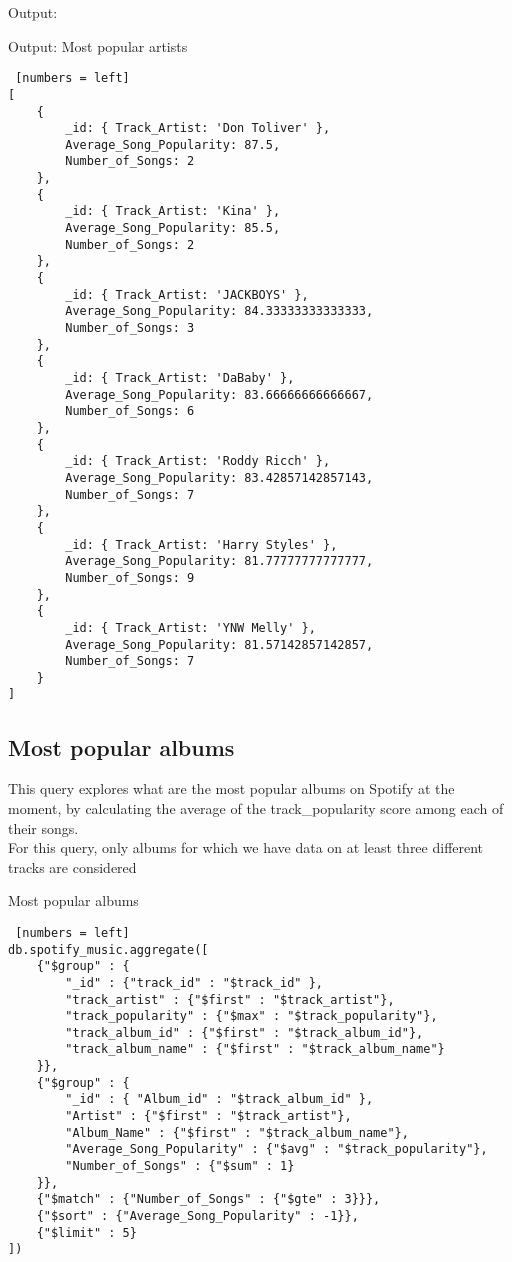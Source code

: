 Output:
\begin{algorithm}[h!]
\caption{Output: Most popular artists}
\begin{lstlisting} [numbers = left]
[
	{
		_id: { Track_Artist: 'Don Toliver' },
		Average_Song_Popularity: 87.5,
		Number_of_Songs: 2
	},
	{
		_id: { Track_Artist: 'Kina' },
		Average_Song_Popularity: 85.5,
		Number_of_Songs: 2
	},
	{
		_id: { Track_Artist: 'JACKBOYS' },
		Average_Song_Popularity: 84.33333333333333,
		Number_of_Songs: 3
	},
	{
		_id: { Track_Artist: 'DaBaby' },
		Average_Song_Popularity: 83.66666666666667,
		Number_of_Songs: 6
	},
	{
		_id: { Track_Artist: 'Roddy Ricch' },
		Average_Song_Popularity: 83.42857142857143,
		Number_of_Songs: 7
	},
	{
		_id: { Track_Artist: 'Harry Styles' },
		Average_Song_Popularity: 81.77777777777777,
		Number_of_Songs: 9
	},
	{
		_id: { Track_Artist: 'YNW Melly' },
		Average_Song_Popularity: 81.57142857142857,
		Number_of_Songs: 7
	}
]
\end{lstlisting}
\end{algorithm}
\newpage

\subsection{Most popular albums}
This query explores what are the most popular albums on Spotify at the moment, by calculating the average of the track\_popularity score among each of their songs.\\
For this query, only albums for which we have data on at least three different tracks are considered
\begin{algorithm}[ht]
\caption{Most popular albums}
\begin{lstlisting} [numbers = left]
db.spotify_music.aggregate([
	{"$group" : {
		"_id" : {"track_id" : "$track_id" },
		"track_artist" : {"$first" : "$track_artist"},
		"track_popularity" : {"$max" : "$track_popularity"},
		"track_album_id" : {"$first" : "$track_album_id"},
		"track_album_name" : {"$first" : "$track_album_name"}
	}},
	{"$group" : {
		"_id" : { "Album_id" : "$track_album_id" },
		"Artist" : {"$first" : "$track_artist"},
		"Album_Name" : {"$first" : "$track_album_name"},
		"Average_Song_Popularity" : {"$avg" : "$track_popularity"},
		"Number_of_Songs" : {"$sum" : 1}
	}},
	{"$match" : {"Number_of_Songs" : {"$gte" : 3}}},
	{"$sort" : {"Average_Song_Popularity" : -1}},
	{"$limit" : 5}
])
\end{lstlisting}
\end{algorithm}
\newpage

